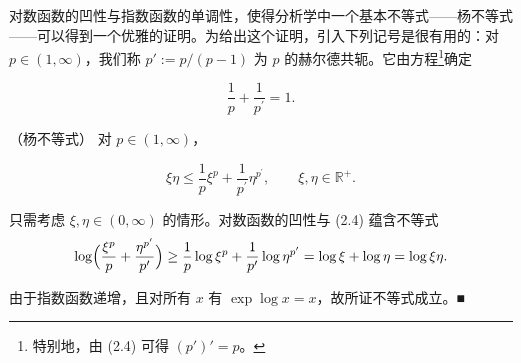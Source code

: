 对数函数的凹性与指数函数的单调性，使得分析学中一个基本不等式——杨不等式——可以得到一个优雅的证明。为给出这个证明，引入下列记号是很有用的：对 $p \in (1, \infty)$，我们称 $p' := p/(p-1)$ 为 $p$ 的赫尔德共轭。它由方程\footnote{特别地，由 (2.4) 可得 $ (p')' = p $。}确定

\[
\frac{1}{p}+\frac{1}{p^{\prime}}=1.
\]

\begin{theorem}

（杨不等式） 对 $ p \in (1, \infty) $，

\[
\xi\eta\leq\frac{1}{p}\xi^{p}+\frac{1}{p^{\prime}}\eta^{p^{\prime}},\qquad\xi,\eta\in\mathbb{R}^{+}.
\]

\proofhead
只需考虑 $ \xi, \eta \in (0, \infty) $ 的情形。对数函数的凹性与 (2.4) 蕴含不等式
\[
\log\Bigl(\frac{\xi^{p}}{p}+\frac{\eta^{p^{\prime}}}{p^{\prime}}\Bigr)\geq\frac{1}{p}\log\xi^{p}+\frac{1}{p^{\prime}}\log\eta^{p^{\prime}}=\log\xi+\log\eta=\log\xi\eta.
\]

由于指数函数递增，且对所有 $ x $ 有 $ \exp \log x = x $，故所证不等式成立。■

\end{theorem}

